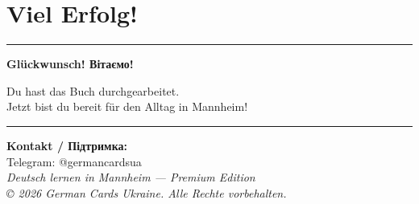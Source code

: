 \documentclass[12pt,twoside,openright]{memoir}
\begin{document}
\chapter*{Viel Erfolg!}

\begin{center}
  {\color{gold}\rule{\linewidth}{2pt}}
  \vspace{1cm}

  {\Large\sffamily\bfseries Glückwunsch! Вітаємо!}

  \vspace{0.5cm}
  Du hast das Buch durchgearbeitet. \\
  Jetzt bist du bereit für den Alltag in Mannheim!

  \vspace{1cm}
  {\color{gold}\rule{\linewidth}{2pt}}

  \vspace{1cm}
  \textbf{Kontakt / Підтримка:}\\
  Telegram: @germancardsua\\

  \vspace{0.5cm}
  \textit{Deutsch lernen in Mannheim — Premium Edition}\\
  \textit{© 2026 German Cards Ukraine. Alle Rechte vorbehalten.}
\end{center}
\end{document}
